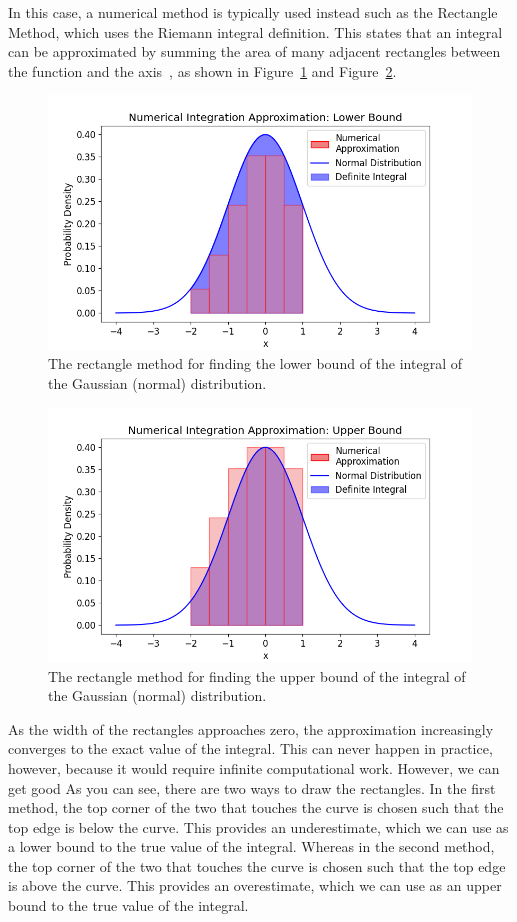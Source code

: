 \documentclass[12pt]{article}
\newcommand{\ndiFigCaption}[1]{The rectangle method for finding the #1 bound of the integral of the Gaussian (normal) distribution.}
\begin{document}
    In this case, a numerical method is typically used instead such as the Rectangle Method, which uses the Riemann integral definition.
    This states that an integral can be approximated by summing the area of many adjacent rectangles between the function and the axis~\cite{NumericalAnalysis2023}, as shown in Figure~\ref{fig:ndi-num_} and Figure~\ref{fig:ndi-num2_}.

    \begin{figure}[H]
        \centering
        \includegraphics[width=0.8\linewidth]{figures/ndi-num/ndi-num_}
        \caption{\ndiFigCaption{lower}}
        \label{fig:ndi-num_}
    \end{figure}

    \begin{figure}[H]
        \centering
        \includegraphics[width=0.8\linewidth]{figures/ndi-num2/ndi-num2_}
        \caption{\ndiFigCaption{upper}}
        \label{fig:ndi-num2_}
    \end{figure}
    As the width of the rectangles approaches zero, the approximation increasingly converges to the exact value of the integral.
    This can never happen in practice, however, because it would require infinite computational work.
    However, we can get good
    As you can see, there are two ways to draw the rectangles.
    In the first method, the top corner of the two that touches the curve is chosen such that the top edge is below the curve.
    This provides an underestimate, which we can use as a lower bound to the true value of the integral.
    Whereas in the second method, the top corner of the two that touches the curve is chosen such that the top edge is above the curve.
    This provides an overestimate, which we can use as an upper bound to the true value of the integral.
\end{document}
